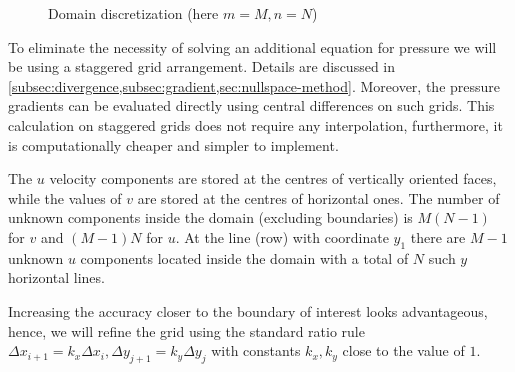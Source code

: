 \documentclass{article}
\numberwithin{equation}{section}
\begin{document}
\begin{figure}[H] %
  \caption{Domain discretization (here $m=M, n=N$)}\label{bl-domain-discretization}
\end{figure}

To eliminate the necessity of solving an additional equation for pressure we will be using a staggered grid arrangement. 
	Details are discussed in \cref{subsec:divergence,subsec:gradient,sec:nullspace-method}. 
	Moreover, the pressure gradients can be evaluated directly using central differences on such grids. 
	This calculation on staggered grids does not require any interpolation, furthermore, it is computationally cheaper and simpler to implement. 

The $u$ velocity components are stored at the centres of vertically oriented faces, while the values of $v$ are stored at the centres of horizontal ones. 
	The number of unknown components inside the domain (excluding boundaries) is $M(N-1)$ for $v$ and $(M-1)N$ for $u$. 
	At the line (row) with coordinate $y_1$ there are $M-1$ unknown $u$ components located inside the domain with a total of $N$ such $y$ horizontal lines. 

Increasing the accuracy closer to the boundary of interest looks advantageous, hence, we will refine the grid using the standard ratio rule $\Delta x_{i+1}=k_x\Delta x_i,\Delta y_{j+1}=k_y\Delta y_j$ with constants $k_x,k_y$ close to the value of $1$. 
	
\end{document}
